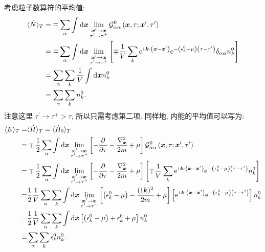 考虑粒子数算符的平均值:
\begin{align}
\langle\hat{N}\rangle_T & =\mp \sum_\alpha \int \mathrm{d} \boldsymbol{x} \lim _{\substack{\boldsymbol{x}^{\prime} \rightarrow \boldsymbol{x} \\
\tau^{\prime} \rightarrow \tau^{+}}} \mathcal{G}_{\alpha \alpha}^0\left(\boldsymbol{x}, \tau ; \boldsymbol{x}^{\prime}, \tau^{\prime}\right) \nonumber\\
& =\mp \sum_\alpha \int \mathrm{d} \boldsymbol{x} \lim _{\substack{\boldsymbol{x}^{\prime} \rightarrow \boldsymbol{x} \\
\tau^{\prime} \rightarrow \tau^{+}}}\left[\mp \frac{1}{V} \sum_k \mathrm{e}^{\hspace{0.1em}\mathrm{i}\hspace{0.1em} \boldsymbol{k} \cdot\left(\boldsymbol{x}-\boldsymbol{x}^{\prime}\right)} \mathrm{e}^{-\left(\epsilon_k^0-\mu\right)\left(\tau-\tau^{\prime}\right)} \delta_{\alpha \alpha } n_k^0\right] \nonumber\\
& =\sum_{ \alpha}\sum_{k} \frac{1}{V} \int \mathrm{d} \boldsymbol{x} n_k^0 \nonumber\\
& =\sum_{ \alpha}\sum_{k} n_k^0 .
\end{align}
注意这里 $\tau^{\prime} \rightarrow \tau^{+}>\tau$, 所以只需考虑第二项. 同样地, 内能的平均值可以写为:
\begin{align}
\langle E\rangle_T=&\langle\hat{H}\rangle_T=\langle\hat{H}_0\rangle_T\nonumber\\
=&\mp \frac{1}{2} \sum_\alpha \int \mathrm{d} \boldsymbol{x} \lim _{\substack{\boldsymbol{x}^{\prime} \rightarrow \boldsymbol{x} \\ \tau^{\prime} \rightarrow \tau^{+}}}\left[-\frac{\partial}{\partial \tau}-\frac{\nabla_{\boldsymbol{x}}^2}{2 m}+\mu\right] \mathcal{G}^0_{\alpha \alpha}\left(\boldsymbol{x}, \tau ; \boldsymbol{x}^{\prime}, \tau^{\prime}\right)\nonumber\\
=&\mp \frac{1}{2} \sum_\alpha \int \mathrm{d} \boldsymbol{x} \lim _{\substack{\boldsymbol{x}^{\prime} \rightarrow \boldsymbol{x} \\ \tau^{\prime} \rightarrow \tau^{+}}}\left[-\frac{\partial}{\partial \tau}-\frac{\nabla_{\boldsymbol{x}}^2}{2 m}+\mu\right]\left[\mp \frac{1}{V} \sum_k \mathrm{e}^{\hspace{0.1em}\mathrm{i}\hspace{0.1em} \boldsymbol{k} \cdot\left(\boldsymbol{x}-\boldsymbol{x}^{\prime}\right)} \mathrm{e}^{-\left(\epsilon_k^0-\mu\right)\left(\tau-\tau^{\prime}\right)} n_k^0\right] \nonumber\\
=& \frac{1}{2}\frac{1}{V}\sum_\alpha\sum_k\int \mathrm{d} \boldsymbol{x}\lim _{\substack{\boldsymbol{x}^{\prime} \rightarrow \boldsymbol{x} \\ \tau^{\prime} \rightarrow \tau^{+}}} \left[\left(\epsilon_k^0-\mu\right)-\frac{(\hspace{0.1em}\mathrm{i}\hspace{0.1em} \boldsymbol{k})^2}{2 m}+\mu\right]\left[\mathrm{e}^{\hspace{0.1em}\mathrm{i}\hspace{0.1em} \boldsymbol{k} \cdot\left(\boldsymbol{x}-\boldsymbol{x}^{\prime}\right)} \mathrm{e}^{-\left(\epsilon_k^0-\mu\right)\left(\tau-\tau^{\prime}\right)}\right]n_k^0\nonumber\\
=& \frac{1}{2}\frac{1}{V}\sum_\alpha\sum_k\int \mathrm{d} \boldsymbol{x}\left[\left(\epsilon_k^0-\mu\right)+\epsilon_k^0+\mu\right]n_k^0\nonumber\\
=&\sum_\alpha\sum_k\epsilon_k^0 n_k^0 .
\end{align}

